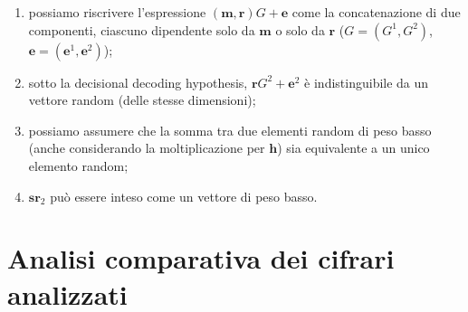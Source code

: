 \documentclass[12pt, a4paper]{report}
\theoremstyle{definition}
\begin{document}
			\renewcommand{\labelenumi}{(\theenumi)}
			\begin{enumerate}
				\item possiamo riscrivere l'espressione $(\mathbf{m},\mathbf{r})G+\mathbf{e}$ come la concatenazione di due componenti, ciascuno dipendente solo da $\mathbf{m}$ o solo da $\mathbf{r}$ ($G=(G^1,G^2)$,$\mathbf{e}=(\mathbf{e}^1,\mathbf{e}^2)$);
				\item sotto la decisional decoding hypothesis, $\mathbf{r}G^2+\textbf{e}^2$ è indistinguibile da un vettore random (delle stesse dimensioni);
				\item possiamo assumere che la somma tra due elementi random di peso basso (anche considerando la moltiplicazione per $\textbf{h}$) sia equivalente a un unico elemento random;
				\item $\mathbf{s}\mathbf{r}_2$ può essere inteso come un vettore di peso basso.
			\end{enumerate}

	\chapter{Analisi comparativa dei cifrari analizzati}
\end{document}
